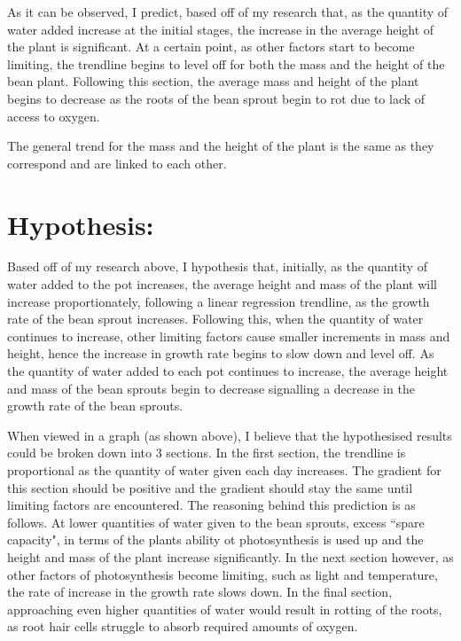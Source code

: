 \documentclass[11pt, a4]{article}
\begin{document}
		As it can be observed, I predict, based off of my research that, as the quantity of water added increase at the initial stages, the increase in the average height of the plant is significant. At a certain point, as other factors start to become limiting, the trendline begins to level off for both the mass and the height of the bean plant. Following this section, the average mass and height of the plant begins to decrease as the roots of the bean sprout begin to rot due to lack of access to oxygen.
		
		\bigbreak
		
		The general trend for the mass and the height of the plant is the same as they correspond and are linked to each other.
	\section{Hypothesis:}
		Based off of my research above, I hypothesis that, initially, as the quantity of water added to the pot increases, the average height and mass of the plant will increase proportionately, following a linear regression trendline, as the growth rate of the bean sprout increases. Following this, when the quantity of water continues to increase, other limiting factors cause smaller increments in mass and height, hence the increase in growth rate begins to slow down and level off. As the quantity of water added to each pot continues to increase, the average height and mass of the bean sprouts begin to decrease signalling a decrease in the growth rate of the bean sprouts.

		\bigbreak

		When viewed in a graph (as shown above), I believe that the hypothesised results could be broken down into 3 sections. In the first section, the trendline is proportional as the quantity of water given each day increases. The gradient for this section should be positive and the gradient should stay the same until limiting factors are encountered. The reasoning behind this prediction is as follows. At lower quantities of water given to the bean sprouts, excess ``spare capacity", in terms of the plants ability ot photosynthesis is used up and the height and mass of the plant increase significantly. In the next section however, as other factors of photosynthesis become limiting, such as light and temperature, the rate of increase in the growth rate slows down. In the final section, approaching even higher quantities of water would result in rotting of the roots, as root hair cells struggle to absorb required amounts of oxygen. 
\end{document}
